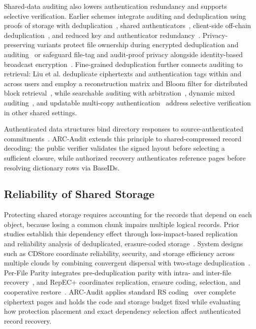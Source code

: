 \documentclass[10pt,journal]{IEEEtran}
\begin{document}
Shared-data auditing also lowers authentication redundancy and supports selective verification. Earlier schemes integrate auditing and deduplication using proofs of storage with deduplication~\cite{Zheng2012POSD}, shared authenticators~\cite{Tian2022SharedAudit}, client-side off-chain deduplication~\cite{Zhang2023BlockchainAudit}, and reduced key and authenticator redundancy~\cite{Miao2024SharedAudit}. Privacy-preserving variants protect file ownership during encrypted deduplication and auditing~\cite{Song2023EncryptedAudit} or safeguard file-tag and audit-proof privacy alongside identity-based broadcast encryption~\cite{Zhang2025PrivacyAudit}. Fine-grained deduplication further connects auditing to retrieval: Liu et al. deduplicate ciphertexts and authentication tags within and across users and employ a reconstruction matrix and Bloom filter for distributed block retrieval~\cite{Liu2025FineGrained}, while searchable auditing with arbitration~\cite{Miao2025}, dynamic mixed auditing~\cite{Pan2026}, and updatable multi-copy authentication~\cite{Xu2026MPA} address selective verification in other shared settings.

Authenticated data structures bind directory responses to source-authenticated commitments~\cite{Goodrich2003ADS}. ARC-Audit extends this principle to shared-compressed record decoding: the public verifier validates the signed layout before selecting a sufficient closure, while authorized recovery authenticates reference pages before resolving dictionary rows via BaseIDs.

\subsection{Reliability of Shared Storage}
Protecting shared storage requires accounting for the records that depend on each object, because losing a common chunk impairs multiple logical records. Prior studies establish this dependency effect through loss-impact-based replication~\cite{Bhagwat2006Reliability} and reliability analysis of deduplicated, erasure-coded storage~\cite{Li2010Reliability}. System designs such as CDStore coordinate reliability, security, and storage efficiency across multiple clouds by combining convergent dispersal with two-stage deduplication~\cite{Li2015CDStore}. Per-File Parity integrates pre-deduplication parity with intra- and inter-file recovery~\cite{Wu2019PFP}, and RepEC+ coordinates replication, erasure coding, selection, and cooperative restore~\cite{Zuo2022RepECPlus}. ARC-Audit applies standard RS coding~\cite{ReedSolomon1960} over complete ciphertext pages and holds the code and storage budget fixed while evaluating how protection placement and exact dependency selection affect authenticated record recovery.
\end{document}
